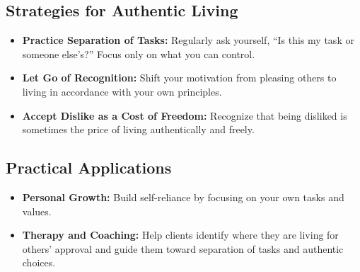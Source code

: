 \subsection*{Strategies for Authentic Living}
\begin{itemize}
    \item \textbf{Practice Separation of Tasks:} Regularly ask yourself, “Is this my task or someone else’s?” Focus only on what you can control.
    \item \textbf{Let Go of Recognition:} Shift your motivation from pleasing others to living in accordance with your own principles.
    \item \textbf{Accept Dislike as a Cost of Freedom:} Recognize that being disliked is sometimes the price of living authentically and freely.
\end{itemize}

\subsection*{Practical Applications}
\begin{itemize}
    \item \textbf{Personal Growth:} Build self-reliance by focusing on your own tasks and values.
    \item \textbf{Therapy and Coaching:} Help clients identify where they are living for others’ approval and guide them toward separation of tasks and authentic choices.
\end{itemize}